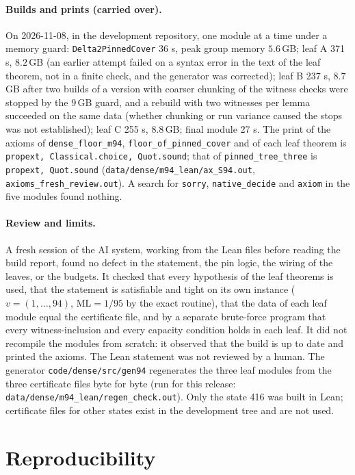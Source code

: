 \documentclass[11pt]{article}
\theoremstyle{remark}
\newcommand{\ML}{\mathrm{ML}}
\begin{document}
\paragraph{Builds and prints (carried over).} On 2026-11-08, in the development repository, one module at a time under a memory guard: \texttt{Delta2PinnedCover} 36 s, peak group memory $5.6$\,GB; leaf A 371 s, $8.2$\,GB (an earlier attempt failed on a syntax error in the text of the leaf theorem, not in a finite check, and the generator was corrected); leaf B 237 s, $8.7$\,GB after two builds of a version with coarser chunking of the witness checks were stopped by the $9$\,GB guard, and a rebuild with two witnesses per lemma succeeded on the same data (whether chunking or run variance caused the stops was not established); leaf C 255 s, $8.8$\,GB; final module 27 s. The print of the axioms of \texttt{dense\_floor\_m94}, \texttt{floor\_of\_pinned\_cover} and of each leaf theorem is \texttt{propext, Classical.choice, Quot.sound}; that of \texttt{pinned\_tree\_three} is \texttt{propext, Quot.sound} (\texttt{data/dense/m94\_lean/ax\_S94.out}, \texttt{axioms\_fresh\_review.out}). A search for \texttt{sorry}, \texttt{native\_decide} and \texttt{axiom} in the five modules found nothing.

\paragraph{Review and limits.} A fresh session of the AI system, working from the Lean files before reading the build report, found no defect in the statement, the pin logic, the wiring of the leaves, or the budgets. It checked that every hypothesis of the leaf theorems is used, that the statement is satisfiable and tight on its own instance ($v=(1,\dots,94)$, $\ML=1/95$ by the exact routine), that the data of each leaf module equal the certificate file, and by a separate brute-force program that every witness-inclusion and every capacity condition holds in each leaf. It did not recompile the modules from scratch: it observed that the build is up to date and printed the axioms. The Lean statement was not reviewed by a human. The generator \texttt{code/dense/src/gen94} regenerates the three leaf modules from the three certificate files byte for byte (run for this release: \texttt{data/dense/m94\_lean/regen\_check.out}). Only the state 416 was built in Lean; certificate files for other states exist in the development tree and are not used.

\section{Reproducibility}\label{sec:repro}
\end{document}
